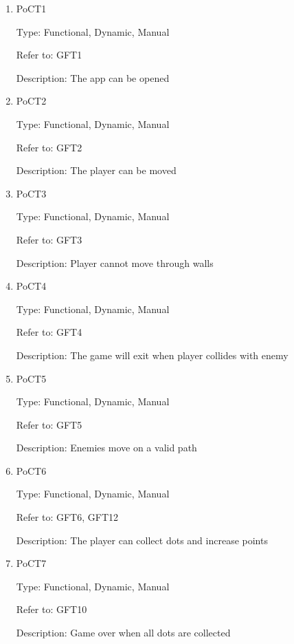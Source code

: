 \documentclass[12pt, titlepage]{article}
\begin{document}
\begin{enumerate}

\item{PoCT1\\}

Type: Functional, Dynamic, Manual
					
Refer to: GFT1
					
Description: The app can be opened


\item{PoCT2\\}

Type: Functional, Dynamic, Manual
					
Refer to: GFT2
					
Description: The player can be moved


\item{PoCT3\\}

Type: Functional, Dynamic, Manual
					
Refer to: GFT3
					
Description: Player cannot move through walls


\item{PoCT4\\}

Type: Functional, Dynamic, Manual
					
Refer to: GFT4
					
Description: The game will exit when player collides with enemy


\item{PoCT5\\}

Type: Functional, Dynamic, Manual
					
Refer to: GFT5
					
Description: Enemies move on a valid path


\item{PoCT6\\}

Type: Functional, Dynamic, Manual
					
Refer to: GFT6, GFT12
					
Description: The player can collect dots and increase points


\item{PoCT7\\}

Type: Functional, Dynamic, Manual
					
Refer to: GFT10
					
Description: Game over when all dots are collected

					
\end{enumerate}
	
\end{document}
